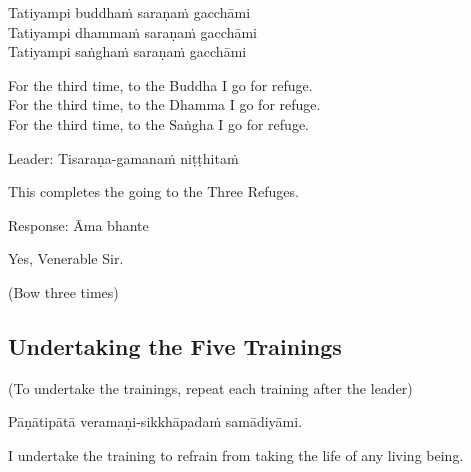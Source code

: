 Tatiyampi buddhaṁ saraṇaṁ gacchāmi\\
Tatiyampi dhammaṁ saraṇaṁ gacchāmi\\
Tatiyampi saṅghaṁ saraṇaṁ gacchāmi\\

\begin{english}
  For the third time, to the Buddha I go for refuge.\\
  For the third time, to the Dhamma I go for refuge.\\
  For the third time, to the Saṅgha I go for refuge.\\
\end{english}

Leader: Tisaraṇa-gamanaṁ niṭṭhitaṁ\\

\begin{english}
  This completes the going to the Three Refuges.\\
\end{english}

Response: Āma bhante\\

\begin{english}
  Yes, Venerable Sir.\\
\end{english}

\begin{center}
  (Bow three times)\\
\end{center}

\subsection{Undertaking the Five Trainings}

\begin{center}
  (To undertake the trainings, repeat each training after the leader)\\
\end{center}

Pāṇātipātā veramaṇi-sikkhāpadaṁ samādiyāmi.\\

\begin{english}
  I undertake the training\hyperlink{endnote136-appendix}{\hypertarget{endnote136-body}{}}
  to refrain from taking the life of any living being.\\
\end{english}

